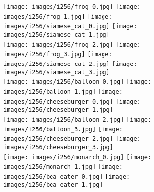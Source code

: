 \documentclass[nohyperref]{article}
\theoremstyle{plain}
\theoremstyle{definition}
\theoremstyle{remark}
\begin{document}
\begin{figure}
\begin{subfigure}[b]{0.495\textwidth}
\texttt{[image: images/i256/frog\_0.jpg]} \hspace{.04cm} \texttt{[image: images/i256/frog\_1.jpg]} \hspace{.04cm}
    \texttt{[image: images/i256/siamese\_cat\_0.jpg]} \hspace{.04cm} \texttt{[image: images/i256/siamese\_cat\_1.jpg]} \\ \vspace{.17cm}
\texttt{[image: images/i256/frog\_2.jpg]} \hspace{.04cm } \texttt{[image: images/i256/frog\_3.jpg]} \hspace{.04cm}
    \texttt{[image: images/i256/siamese\_cat\_2.jpg]} \hspace{.04cm } \texttt{[image: images/i256/siamese\_cat\_3.jpg]} \\ \vspace{.17cm}
\texttt{[image: images/i256/balloon\_0.jpg]} \hspace{.04cm} \texttt{[image: images/i256/balloon\_1.jpg]} \hspace{.04cm}
    \texttt{[image: images/i256/cheeseburger\_0.jpg]} \hspace{.04cm} \texttt{[image: images/i256/cheeseburger\_1.jpg]} \\ \vspace{.17cm}
\texttt{[image: images/i256/balloon\_2.jpg]} \hspace{.04cm } \texttt{[image: images/i256/balloon\_3.jpg]} \hspace{.04cm}
    \texttt{[image: images/i256/cheeseburger\_2.jpg]} \hspace{.04cm } \texttt{[image: images/i256/cheeseburger\_3.jpg]} \\ \vspace{.17cm}
\texttt{[image: images/i256/monarch\_0.jpg]} \hspace{.04cm} \texttt{[image: images/i256/monarch\_1.jpg]} \hspace{.04cm}
    \texttt{[image: images/i256/bea\_eater\_0.jpg]} \hspace{.04cm} \texttt{[image: images/i256/bea\_eater\_1.jpg]} \\ \vspace{.17cm}

\end{subfigure}
\end{figure}
\end{document}
